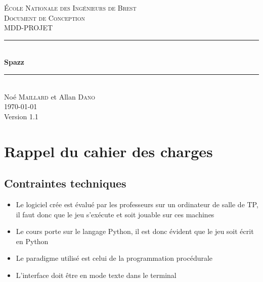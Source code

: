 \documentclass[a4paper,11pt]{scrartcl}
\begin{document}
\begin{titlepage}

\newcommand{\HRule}{\rule{\linewidth}{0.5mm}} %

\center %


\textsc{\LARGE École Nationale des Ingénieurs de Brest}\\[1.5cm]
\textsc{\Large Document de Conception}\\[0.5cm]
\textsc{\large MDD-PROJET}\\[0.5cm]


\HRule \\[0.4cm]
{\huge \bfseries Spazz}\\[0.4cm] %
\HRule \\[1.5cm]

\Large
Noé \textsc{Maillard} et Allan \textsc{Dano}\\[3cm]


{\large \today}\\[3cm] %

{\large Version 1.1}


\vfill

\end{titlepage}

\tableofcontents
\newpage
\section{Rappel du cahier des charges}

\subsection{Contraintes techniques}

\begin{itemize}[label = $\bullet$]
	\item Le logiciel crée est évalué par les professeurs sur un ordinateur de salle de TP, il faut donc que le jeu s’exécute et soit jouable sur ces machines
	\item Le cours porte sur le langage Python, il est donc évident que le jeu soit écrit en Python
	\item Le paradigme utilisé est celui de la programmation procédurale
	\item L'interface doit être en mode texte dans le terminal
\end{itemize}
\end{document}
